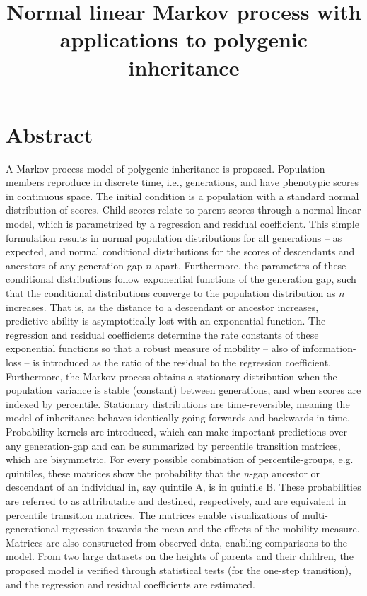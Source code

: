 \documentclass[a4paper,11pt]{article} %
\title{Normal linear Markov process with applications to polygenic inheritance}
\author{}
\date{}
\begin{document}
\maketitle





\section*{Abstract}
A Markov process model of polygenic inheritance is proposed. Population members reproduce in discrete time, i.e., generations, and have phenotypic scores in continuous space. The initial condition is a population with a standard normal distribution of scores. Child scores relate to parent scores through a normal linear model, which is parametrized by a regression and residual coefficient. This simple formulation results in normal population distributions for all generations -- as expected, and normal conditional distributions for the scores of descendants and ancestors of any generation-gap $n$ apart. Furthermore, the parameters of these conditional distributions follow exponential functions of the generation gap, such that the conditional distributions converge to the population distribution as $n$ increases. That is, as the distance to a descendant or ancestor increases, predictive-ability is asymptotically lost with an exponential function. The regression and residual coefficients determine the rate constants of these exponential functions so that a robust measure of mobility -- also of information-loss -- is introduced as the ratio of the residual to the regression coefficient. Furthermore, the Markov process obtains a stationary distribution when the population variance is stable (constant) between generations, and when scores are indexed by percentile. Stationary distributions are time-reversible, meaning the model of inheritance behaves identically going forwards and backwards in time. Probability kernels are introduced, which can make important predictions over any generation-gap and can be summarized by percentile transition matrices, which are bisymmetric. For every possible combination of percentile-groups, e.g. quintiles, these matrices show the probability that the $n$-gap ancestor or descendant of an individual in, say quintile A, is in quintile B. These probabilities are referred to as attributable and destined, respectively, and are equivalent in percentile transition matrices. The matrices enable visualizations of multi-generational regression towards the mean and the effects of the mobility measure. Matrices are also constructed from observed data, enabling comparisons to the model. From two large datasets on the heights of parents and their children, the proposed model is verified through statistical tests (for the one-step transition), and the regression and residual coefficients are estimated.
\end{document}
